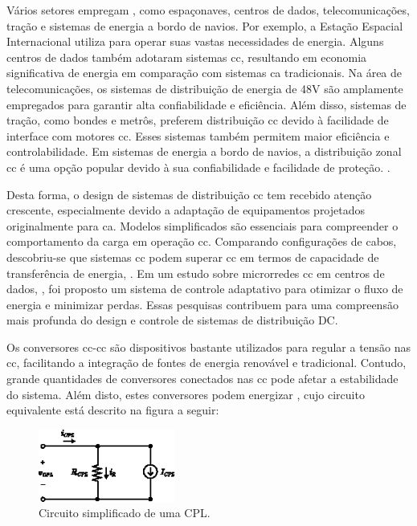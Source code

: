 Vários setores empregam , como espaçonaves, centros de dados, telecomunicações, tração e sistemas de energia a bordo de navios. Por exemplo, a Estação Espacial Internacional utiliza  para operar suas vastas necessidades de energia. Alguns centros de dados também adotaram sistemas \acrshort{cc}, resultando em economia significativa de energia em comparação com sistemas \acrshort{ca} tradicionais. Na área de telecomunicações, os sistemas de distribuição de energia de 48V são amplamente empregados para garantir alta confiabilidade e eficiência. Além disso, sistemas de tração, como bondes e metrôs, preferem distribuição \acrshort{cc} devido à facilidade de interface com motores \acrshort{cc}. Esses sistemas também permitem maior eficiência e controlabilidade. Em sistemas de energia a bordo de navios, a distribuição zonal \acrshort{cc} é uma opção popular devido à sua confiabilidade e facilidade de proteção. \cite{Elsayed2015}.

Desta forma, o design de sistemas de distribuição \acrshort{cc} tem recebido atenção crescente, especialmente devido a adaptação de equipamentos projetados originalmente para \acrshort{ca}. Modelos simplificados são essenciais para compreender o comportamento da carga em operação \acrshort{cc}. Comparando configurações de cabos, descobriu-se que sistemas \acrshort{cc} podem superar \acrshort{cc} em termos de capacidade de transferência de energia, \cite{Salomonsson2007}. Em um estudo sobre microrredes \acrshort{cc} em centros de dados, \cite{Salomonsson2008}, foi proposto um sistema de controle adaptativo para otimizar o fluxo de energia e minimizar perdas. Essas pesquisas contribuem para uma compreensão mais profunda do design e controle de sistemas de distribuição DC.

Os conversores \acrshort{cc}-\acrshort{cc} são dispositivos bastante utilizados para regular a tensão nas  \acrshort{cc}, facilitando a integração de fontes de energia renovável e tradicional. Contudo, grande quantidades de conversores conectados nas  \acrshort{cc} pode afetar a estabilidade do sistema. Além disto, estes conversores podem energizar , cujo circuito equivalente está descrito na figura a seguir:

\begin{figure}[H]
  \centering
  \includegraphics[width=0.4\textwidth]{figuras/cpl_circuit.eps}
  \caption{Circuito simplificado de uma CPL.}
  \label{fig:cpl_circuit}
\end{figure}

